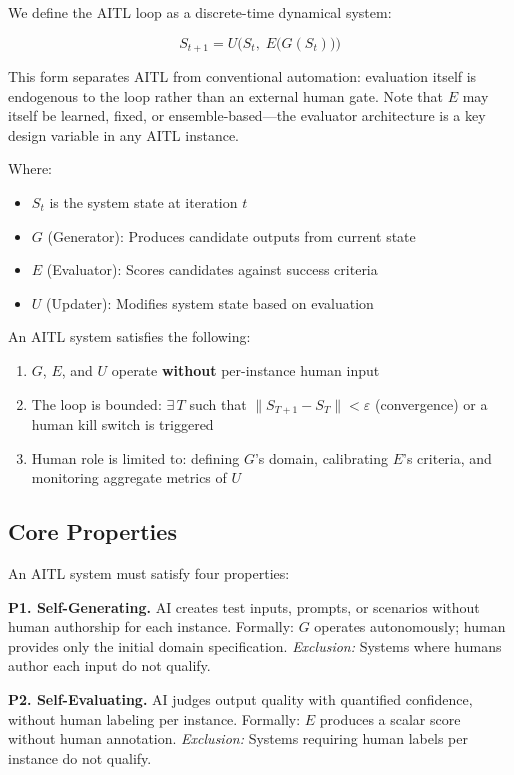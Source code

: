 \documentclass[11pt]{article}
\begin{document}
We define the AITL loop as a discrete-time dynamical system:

\begin{equation}
  S_{t+1} = U\bigl(S_t,\; E\bigl(G(S_t)\bigr)\bigr)
  \label{eq:aitl}
\end{equation}

This form separates AITL from conventional automation: evaluation itself is endogenous to the loop rather than an external human gate. Note that $E$ may itself be learned, fixed, or ensemble-based---the evaluator architecture is a key design variable in any AITL instance.

Where:
\begin{itemize}[nosep]
  \item $S_t$ is the system state at iteration $t$
  \item $G$ (Generator): Produces candidate outputs from current state
  \item $E$ (Evaluator): Scores candidates against success criteria
  \item $U$ (Updater): Modifies system state based on evaluation
\end{itemize}

An AITL system satisfies the following:
\begin{enumerate}[nosep]
  \item $G$, $E$, and $U$ operate \textbf{without} per-instance human input
  \item The loop is bounded: $\exists\, T$ such that $\|S_{T+1} - S_T\| < \varepsilon$ (convergence) or a human kill switch is triggered
  \item Human role is limited to: defining $G$'s domain, calibrating $E$'s criteria, and monitoring aggregate metrics of $U$
\end{enumerate}

\subsection{Core Properties}

An AITL system must satisfy four properties:

\textbf{P1. Self-Generating.} AI creates test inputs, prompts, or scenarios without human authorship for each instance. Formally: $G$ operates autonomously; human provides only the initial domain specification. \emph{Exclusion:} Systems where humans author each input do not qualify.

\textbf{P2. Self-Evaluating.} AI judges output quality with quantified confidence, without human labeling per instance. Formally: $E$ produces a scalar score without human annotation. \emph{Exclusion:} Systems requiring human labels per instance do not qualify.
\end{document}
